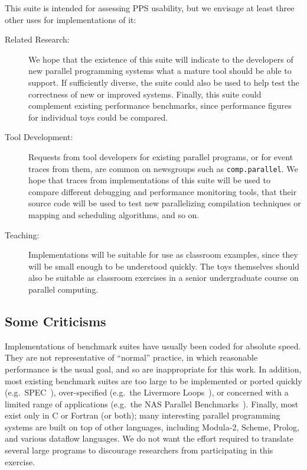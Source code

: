 This suite is intended for assessing PPS usability,
but we envisage at least three other uses for implementations of it:
\begin{description}
\item[Related Research:]
	We hope that the existence of this suite will indicate
	to the developers of new parallel programming systems
	what a mature tool should be able to support.
	If sufficiently diverse,
	the suite could also be used to help test the correctness of new or improved systems.
	Finally,
	this suite could complement existing performance benchmarks,
	since performance figures for individual toys could be compared.
\item[Tool Development:]
	Requests from tool developers for existing parallel programs,
	or for event traces from them,
	are common on newsgroups such as {\tt{comp.parallel}}.
	We hope that traces from implementations of this suite
	will be used to compare different debugging and performance monitoring tools,
	that their source code will be used to test
	new parallelizing compilation techniques or mapping and scheduling algorithms,
	and so on.
\item[Teaching:]
	Implementations will be suitable for use as classroom examples,
	since they will be small enough to be understood quickly.
	The toys themselves should also be suitable as classroom exercises
	in a senior undergraduate course on parallel computing.
\end{description}

\subsection{Some Criticisms\label{s:method-criticism}}


Implementations of benchmark suites have usually been coded for absolute speed.
They are not representative of ``normal'' practice,
in which reasonable performance is the usual goal,
and so are inappropriate for this work.
In addition,
most existing benchmark suites are too large to be implemented or ported quickly
(e.g.\ SPEC~\cite{b:bench-over}),
over-specified (e.g.\ the Livermore Loops~\cite{b:livermore-loops}),
or concerned with a limited range of applications
(e.g.\ the NAS Parallel Benchmarks~\cite{b:nas-results}).
Finally,
most exist only in C or Fortran (or both);
many interesting parallel programming systems are built on top of other languages,
including Modula-2, Scheme, Prolog, and various dataflow languages.
We do not want the effort required to translate several large programs
to discourage researchers from participating in this exercise.

